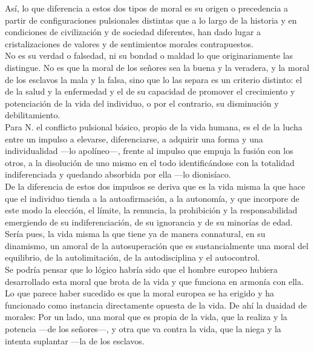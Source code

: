 \documentclass[a4paper, 10pt, twocolumn, spanish]{article}
\begin{document}
Así, lo que diferencia a estos dos tipos de moral es su origen o
precedencia a partir de configuraciones pulsionales distintas que a lo
largo de la historia y en condiciones de civilización y de sociedad
diferentes, han dado lugar a cristalizaciones de valores y de
sentimientos morales contrapuestos.\\[0pt]
No es su verdad o falsedad, ni su bondad o maldad lo que
originariamente las distingue. No es que la moral de los señores sea
la buena y la veradera, y la moral de los esclavos la mala y la falsa,
sino que lo las separa es un criterio distinto: el de la salud y la
enfermedad y el de su capacidad de promover el crecimiento y
potenciación de la vida del individuo, o por el contrario, su
disminución y debilitamiento.\\[0pt]

Para N. el conflicto pulsional básico, propio de la vida humana, es el
de la lucha entre un impulso a elevarse, diferenciarse, a adquirir una
forma y una individualidad —lo apolíneo—, frente al impulso que empuja
la fusión con los otros, a la disolución de uno mismo en el todo
identificándose con la totalidad indiferenciada y quedando absorbida
por ella —lo dionisíaco.\\[0pt]
De la diferencia de estos dos impulsos se deriva que es la vida misma
la que hace que el individuo tienda a la autoafirmación, a la
autonomía, y que incorpore de este modo la elección, el límite, la
renuncia, la prohibición y la responsabilidad emergiendo de su
indiferenciación, de su ignorancia y de su minorías de edad.\\[0pt]

Sería pues, la vida misma la que tiene ya de manera connatural, en su
dinamismo, un amoral de la autosuperación que es sustancialmente una
moral del equilibrio, de la autolimitación, de la autodisciplina y el
autocontrol.\\[0pt]


Se podría pensar que lo lógico habría sido que el hombre europeo
hubiera desarrollado esta moral que brota de la vida y que funciona en
armonía con ella.\\[0pt]
Lo que parece haber sucedido es que la moral europea se ha erigido y
ha funcionado como instancia directamente opuesta de la vida. De ahí
la duaidad de morales: Por un lado, una moral que es propia de la
vida, que la realiza y la potencia —de los señores—, y otra que va
contra la vida, que la niega y la intenta suplantar —la de los
esclavos.\\[0pt]
\end{document}
